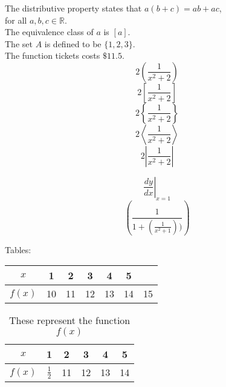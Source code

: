 \documentclass[11pt]{article}
\begin{document}
The distributive property states that $a(b+c) = ab + ac$, \\
for all $a, b, c \in \mathbb{R}$. \\[6pt]

The equivalence class of $a$ is $[a]$. \\ [6pt]

The set $A$ is defined to be $\{1, 2, 3\}$.\\[6pt]
The function tickets costs $\$11.5$. \\[6pt]

$$2\left(\frac{1}{x^2+2}\right)$$
$$2\left[\frac{1}{x^2+2}\right]$$
$$2\left\{\frac{1}{x^2+2}\right\}$$
$$2\left \langle \frac{1}{x^2+2}\right \rangle$$
$$2\left | \frac{1}{x^2+2}\right |$$

$$\left.\frac{dy}{dx}\right|_{x=1} $$
$$ \left (\frac{1} {1 +\left (\frac{1}{x^2+1} \right) )}\right)$$


Tables:\\



\begin{tabular}{|c|c|c|c|c|c|}
    \hline
    $x$ & 1 & 2 & 3 & 4 & 5 \\ \hline
    $f(x)$ & 10 & 11 & 12 & 13 & 14 & 15\\ \hline
\end{tabular}

\vspace{1cm}

\begin{table}[H]
    \def\arraystretch{2}
    \begin{tabular}{|c||c|c|c|c|c|}
        \hline
        $x$ & 1 & 2 & 3 & 4 & 5 \\ \hline
        $f(x)$ & $\frac{1}{2}$  & 11 & 12 & 13 & 14 \\ \hline
    \end{tabular}
    \caption{These represent the function $f(x)$}
\end{table}
\end{document}

